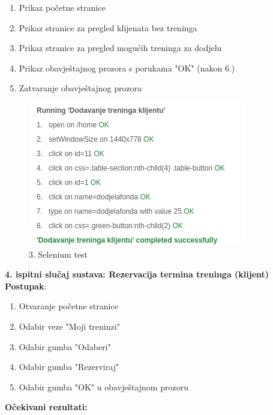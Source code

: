 		\begin{enumerate}
		    \item Prikaz početne stranice
                \item Prikaz stranice za pregled klijenata bez treninga
                \item Prikaz stranice za pregled mogućih treninga za dodjelu
                \item Prikaz obavještajnog prozora s porukama "OK" (nakon 6.)
                \item Zatvaranje obavještajnog prozora
		\end{enumerate}
            \begin{figure}[H]
		\includegraphics[scale=1]{./Slike/dodjela_treninga_klijentu.png}
		\centering
		\caption{3. Selenium test}
		\label{fig:promjene}
	    \end{figure}
     
     \noindent \textbf{4. ispitni slučaj sustava: Rezervacija termina treninga (klijent)}
            \newline \textbf{Postupak}:
            \begin{enumerate}
                
            \item Otvaranje početne stranice

            \item Odabir veze "Moji treninzi"

            \item Odabir gumba "Odaberi"
            
            \item Odabir gumba "Rezerviraj"

            \item Odabir gumba "OK" u obavještajnom prozoru

            \end{enumerate}
            \textbf{Očekivani rezultati:}
            
